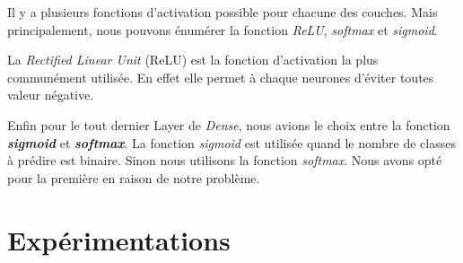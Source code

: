 \documentclass{rapport}
\begin{document}
            Il y a plusieurs fonctions d'activation possible pour chacune des couches. Mais principalement, nous pouvons énumérer la fonction \textit{ReLU}, \textit{softmax} et \textit{sigmoid}. 
            
            La \textit{Rectified Linear Unit} (ReLU) est la fonction d'activation la plus communément utilisée. En effet elle permet à chaque neurones d'éviter toutes valeur négative.
            
            Enfin pour le tout dernier Layer de \textit{Dense}, nous avions le choix entre la fonction \textit{\textbf{sigmoid}} et \textit{\textbf{softmax}}. La fonction \textit{sigmoid} est utilisée quand le nombre de classes à prédire est binaire. Sinon nous utilisons la fonction \textit{softmax}. Nous avons opté pour la première en raison de notre problème.
        
    \section{Expérimentations}
        
\end{document}

